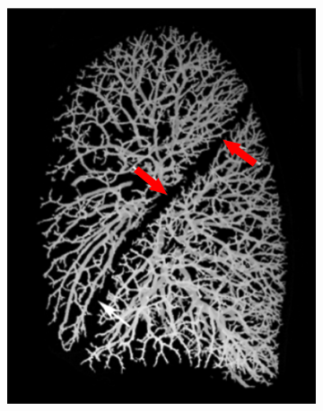 \begin{figure}[htbp]
\begin{subfigure}{.3\linewidth}
  \includegraphics[width=\linewidth,trim={{.0\wd0} {.0\wd0} {.0\wd0} {.0\wd0}},clip]{Segmentation/Image/VolumetricVesselTree.png}
  \caption{}
  \label{fig:AnatomicalBasedSegmentation-a} 
\end{subfigure}
\hspace{.6in} %
\begin{subfigure}{.43\linewidth}%

\end{subfigure}
\end{figure}
